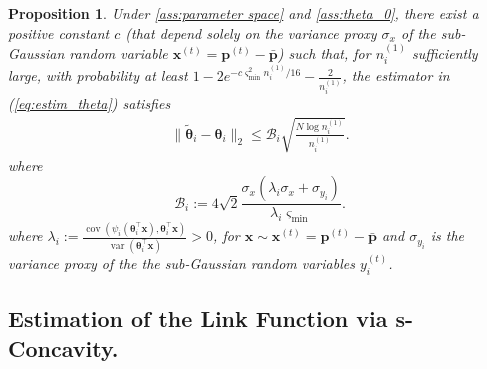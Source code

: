\documentclass{article} %
\def\eqref#1{equation~\ref{#1}}
\renewcommand{\eqref}[1]{(\ref{#1})}
\newtheorem{proposition}[theorem]{Proposition}
\begin{document}
\begin{proposition}\label{prop:concentration_ineq_theta}
Under \cref{ass:parameter space} and \cref{ass:theta_0}, there exist a positive constant $c$ (that depend solely on the variance proxy $\sigma_x$ of the sub-Gaussian random variable $\mathbf{x}^{(t)} = \mathbf{p}^{(t)}- \bar{\mathbf{p}}$) such that, for $n_i^{(1)}$ sufficiently large, with probability  at least $1- 2e^{-c \varsigma_{\min }^{2} n_i^{(1)} / 16}-\frac{2}{n_i^{(1)}}$, the estimator in \eqref{eq:estim_theta} satisfies
$$
\begin{aligned}
\|\widetilde{\boldsymbol{\theta}}_i - \boldsymbol{\theta}_i \|_2 \leq  \mathscr{B}_i \sqrt{\tfrac{N\log n_i^{(1)}}{n_i^{(1)}}}.
\end{aligned}
$$
where 
\begin{equation}\label{def:B_i}
\mathscr{B}_i :=4\sqrt{2}\frac{\sigma_x (\lambda_i\sigma_x+\sigma_{y_i})}{\lambda_i \varsigma_{\min}}.
\end{equation}
where $\lambda_i :=   \frac{\operatorname{cov}\left(\psi_i(\boldsymbol{\theta}_i^{\top}\mathbf{x}),\boldsymbol{\theta}_i^{\top}\mathbf{x}\right)}{\operatorname{var}(\boldsymbol{\theta}_i^\top \mathbf{x})}>0$, for $\mathbf{x} \sim \mathbf{x}^{(t)} = \mathbf{p}^{(t)}- \bar{\mathbf{p}}$ and $\sigma_{y_i}$ is the variance proxy of the the sub-Gaussian random variables $y_i^{(t)}$.
\end{proposition} 

\subsection{Estimation of the Link Function via s-Concavity.}\label{sec:estimation_on_psi}
\end{document}
